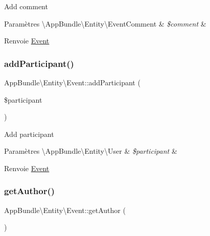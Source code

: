 Add comment


\begin{DoxyParams}[1]{Paramètres}
\textbackslash{}\+App\+Bundle\textbackslash{}\+Entity\textbackslash{}\+Event\+Comment & {\em \$comment} & \\
\hline
\end{DoxyParams}
\begin{DoxyReturn}{Renvoie}
\hyperlink{classAppBundle_1_1Entity_1_1Event}{Event} 
\end{DoxyReturn}
\mbox{\label{classAppBundle_1_1Entity_1_1Event_abc3d3ec1eb7e6d40ea11690e2321bfdc}} 
\subsubsection{\texorpdfstring{add\+Participant()}{addParticipant()}}
{\footnotesize\ttfamily App\+Bundle\textbackslash{}\+Entity\textbackslash{}\+Event\+::add\+Participant (\begin{DoxyParamCaption}\item[{\textbackslash{}\hyperlink{classAppBundle_1_1Entity_1_1User}{App\+Bundle\textbackslash{}\+Entity\textbackslash{}\+User}}]{\$participant }\end{DoxyParamCaption})}

Add participant


\begin{DoxyParams}[1]{Paramètres}
\textbackslash{}\+App\+Bundle\textbackslash{}\+Entity\textbackslash{}\+User & {\em \$participant} & \\
\hline
\end{DoxyParams}
\begin{DoxyReturn}{Renvoie}
\hyperlink{classAppBundle_1_1Entity_1_1Event}{Event} 
\end{DoxyReturn}
\mbox{\label{classAppBundle_1_1Entity_1_1Event_a5a717cc787d1c40bdcb32ebf0c31b4c4}} 
\subsubsection{\texorpdfstring{get\+Author()}{getAuthor()}}
{\footnotesize\ttfamily App\+Bundle\textbackslash{}\+Entity\textbackslash{}\+Event\+::get\+Author (\begin{DoxyParamCaption}{ }\end{DoxyParamCaption})}

